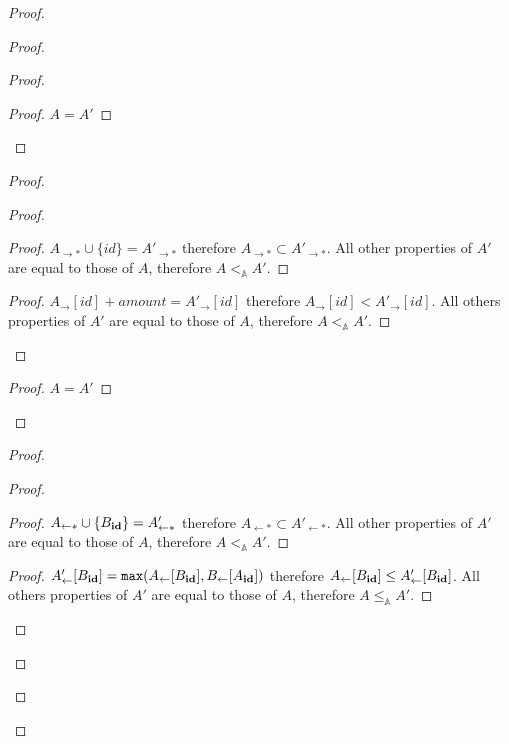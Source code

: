 \documentclass[9pt]{article}   	%
\begin{document}
\begin{proof}
\begin{proof}
\begin{proof}
			\begin{proof}
				$A=A'$
			\end{proof}
		\end{proof}
		
		\begin{proof}
			\begin{proof}
				\begin{proof}
					$A_{\rightarrow *} \cup \{ \textit{id} \} = A'_{\rightarrow *}$ therefore $A_{\rightarrow *} \subset A'_{\rightarrow *}$. All other properties of $A'$ are equal to those of $A$, therefore $A <_\mathds{A} A'$.
				\end{proof}
				
				\begin{proof}
					$A_\rightarrow[id] + \textit{amount} = A'_\rightarrow[id]$ therefore $A_\rightarrow[id] < A'_\rightarrow[id]$. All others properties of $A'$ are equal to those of $A$, therefore $A <_\mathds{A} A'$.
				\end{proof} 
			\end{proof}
			
			\begin{proof}
				$A=A'$
			\end{proof}
		\end{proof}
		
		\begin{proof}
			\begin{proof}
				\begin{proof}
					$A_{\leftarrow *} \cup \{ B_{\scriptsize \textbf{id}} \} = A'_{\leftarrow *}$ therefore $A_{\leftarrow *} \subset A'_{\leftarrow *}$. All other properties of $A'$ are equal to those of $A$, therefore $A <_\mathds{A} A'$.
				\end{proof}
				
				\begin{proof}
					$A'_\leftarrow[B_{\scriptsize \textbf{id}}] = \texttt{max}(A_\leftarrow[B_{\scriptsize \textbf{id}}], B_\leftarrow[A_{\scriptsize \textbf{id}}])$ therefore $A_\leftarrow[B_{\scriptsize \textbf{id}}] \leq A'_\leftarrow[B_{\scriptsize \textbf{id}}]$. All others properties of $A'$ are equal to those of $A$, therefore $A \leq_\mathds{A} A'$.
				\end{proof} 
			\end{proof}
			

\end{proof}
\end{proof}
\end{proof}
\end{document}
